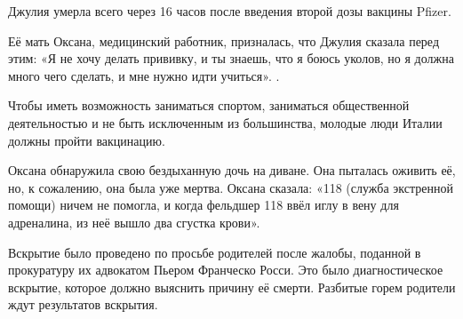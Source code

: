 Джулия умерла всего через 16 часов после введения второй дозы вакцины Pfizer.

Её мать Оксана, медицинский работник, призналась, что Джулия сказала перед этим:
«Я не хочу делать прививку, и ты знаешь, что я боюсь уколов, но я должна много
чего сделать, и мне нужно идти учиться». .

Чтобы иметь возможность заниматься спортом, заниматься общественной
деятельностью и не быть исключенным из большинства, молодые люди Италии должны
пройти вакцинацию.

Оксана обнаружила свою бездыханную дочь на диване. Она пыталась оживить её, но,
к сожалению, она была уже мертва. Оксана сказала: «118 (служба экстренной
помощи) ничем не помогла, и когда фельдшер 118 ввёл иглу в вену для адреналина,
из неё вышло два сгустка крови».

Вскрытие было проведено по просьбе родителей после жалобы, поданной в
прокуратуру их адвокатом Пьером Франческо Росси. Это было диагностическое
вскрытие, которое должно выяснить причину её смерти. Разбитые горем родители
ждут результатов вскрытия.
